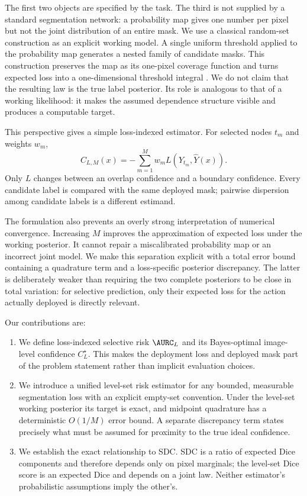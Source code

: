 The first two objects are specified by the task. The third is not supplied by a
standard segmentation network: a probability map gives one number per pixel but not
the joint distribution of an entire mask. We use a classical random-set construction
as an explicit working model. A single uniform threshold applied to the probability
map generates a nested family of candidate masks. This construction preserves the
map as its one-pixel coverage function and turns expected loss into a one-dimensional
threshold integral \cite{goodman,molchanov}. We do not claim that the resulting law
is the true label posterior. Its role is analogous to that of a working likelihood:
it makes the assumed dependence structure visible and produces a computable target.

This perspective gives a simple loss-indexed estimator. For selected nodes $t_m$ and
weights $w_m$,
\begin{equation*}
  C_{L,M}(x)
  =-\sum_{m=1}^M w_m L\!\left(Y_{t_m},\widehat Y(x)\right).
\end{equation*}
Only $L$ changes between an overlap confidence and a boundary confidence. Every
candidate label is compared with the same deployed mask; pairwise dispersion among
candidate labels is a different estimand.

The formulation also prevents an overly strong interpretation of numerical
convergence. Increasing $M$ improves the approximation of expected loss under the
working posterior. It cannot repair a miscalibrated probability map or an incorrect
joint model. We make this separation explicit with a total error bound containing a
quadrature term and a loss-specific posterior discrepancy. The latter is deliberately
weaker than requiring the two complete posteriors to be close in total variation: for
selective prediction, only their expected loss for the action actually deployed is
directly relevant.

Our contributions are:
\begin{enumerate}
\item We define loss-indexed selective risk $\AURC_L$ and its Bayes-optimal
image-level confidence $C_L^\star$. This makes the deployment loss and deployed mask
part of the problem statement rather than implicit evaluation choices.
\item We introduce a unified level-set risk estimator for any bounded, measurable
segmentation loss with an explicit empty-set convention. Under the level-set working
posterior its target is exact, and midpoint quadrature has a deterministic
$O(1/M)$ error bound. A separate discrepancy term states precisely what must be
assumed for proximity to the true ideal confidence.
\item We establish the exact relationship to SDC. SDC is a ratio of expected Dice
components and therefore depends only on pixel marginals; the level-set Dice score is
an expected Dice and depends on a joint law. Neither estimator's probabilistic
assumptions imply the other's.
\end{enumerate}

